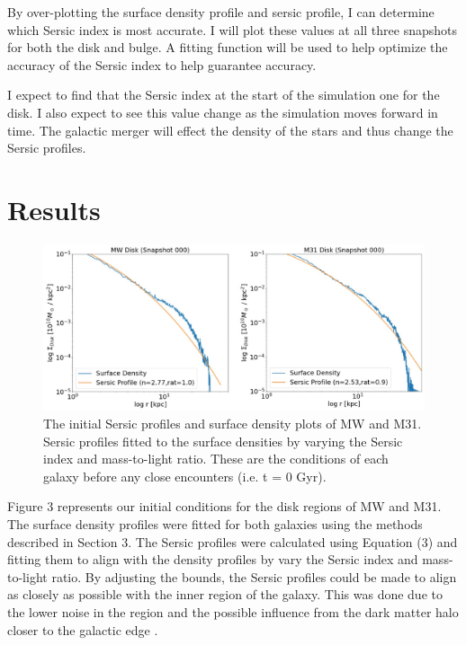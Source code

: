 \documentclass[linenumbers,trackchanges]{aastex7}
\begin{document}
By over-plotting the surface density profile and sersic profile, I
can determine which Sersic index is most accurate. I will plot these
values at all three snapshots for both the disk and bulge. A fitting
function will be used to help optimize the accuracy of the Sersic
index to help guarantee accuracy.

I expect to find that the Sersic index at the start of the simulation
one for the disk. I also expect to see this value change as the
simulation moves forward in time. The galactic merger will effect the
density of the stars and thus change the Sersic profiles.

\section{Results} \label{sec:style}

\begin{figure}[h!]
\centering
\includegraphics[scale=0.35]{Results_000.jpg}
\caption{The initial Sersic profiles and surface density plots of MW and M31. Sersic profiles fitted to the surface densities by varying the Sersic index and mass-to-light ratio. These are the conditions of each galaxy before any close encounters (i.e. t = 0 Gyr).
\label{fig:general}}
\end{figure}

Figure 3 represents our initial conditions for the disk regions of MW
and M31. The surface density profiles were fitted for both galaxies
using the methods described in Section 3. The Sersic profiles were
calculated using Equation (3) and fitting them to align with the
density profiles by vary the Sersic index and mass-to-light ratio. By
adjusting the bounds, the Sersic profiles could be made to align as
closely as possible with the inner region of the galaxy. This was done
due to the lower noise in the region and the possible influence from
the dark matter halo closer to the galactic edge
\citep{Takamiya_Sofue_2000}.
\end{document}
